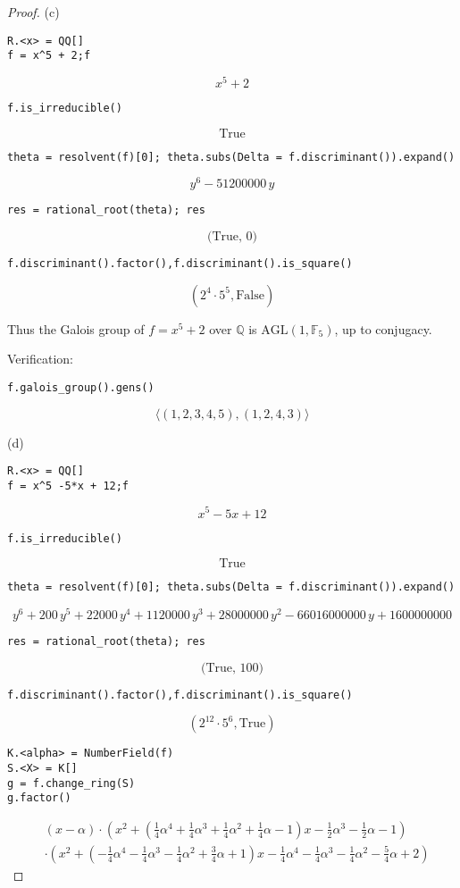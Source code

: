 \documentclass[11pt,a4paper]{article}
\newcommand{\Q}{\mathbb{Q}}
\newcommand{\F}{\mathbb{F}}
\begin{document}
\begin{proof}
\item[(c)]
\begin{verbatim}
R.<x> = QQ[]
f = x^5 + 2;f
\end{verbatim}
$$	
x^{5} + 2
$$
\begin{verbatim}
f.is_irreducible()
\end{verbatim}
$$\text{True}$$
\begin{verbatim}
theta = resolvent(f)[0]; theta.subs(Delta = f.discriminant()).expand()
\end{verbatim}
$$y^{6} - 51200000 \, y
$$
\begin{verbatim}
res = rational_root(theta); res
\end{verbatim}
$$\text{(True, 0)}$$
\begin{verbatim}
f.discriminant().factor(),f.discriminant().is_square()
\end{verbatim}
$$(2^{4} \cdot 5^{5}, \text{False})
$$

Thus the Galois group of $f = x^5+2$ over $\Q$ is $\mathrm{AGL}(1,\F_5)$, up to conjugacy.

Verification:
\begin{verbatim}
f.galois_group().gens()
\end{verbatim}
$$	
\langle (1,2,3,4,5), (1,2,4,3) \rangle
$$

\item[(d)]
\begin{verbatim}
R.<x> = QQ[]
f = x^5 -5*x + 12;f
\end{verbatim}
$$	
x^{5} - 5x + 12
$$
\begin{verbatim}
f.is_irreducible()
\end{verbatim}
$$\text{True}$$
\begin{verbatim}
theta = resolvent(f)[0]; theta.subs(Delta = f.discriminant()).expand()
\end{verbatim}
$$y^{6} + 200 \, y^{5} + 22000 \, y^{4} + 1120000 \, y^{3} + 28000000 \,
y^{2} - 66016000000 \, y + 1600000000
$$
\begin{verbatim}
res = rational_root(theta); res
\end{verbatim}
$$\text{(True, 100)}$$
\begin{verbatim}
f.discriminant().factor(),f.discriminant().is_square()
\end{verbatim}

$$(2^{12} \cdot 5^{6}, \text{True})$$
\begin{verbatim}
K.<alpha> = NumberField(f)
S.<X> = K[]
g = f.change_ring(S)
g.factor()
\end{verbatim}
\begin{align*}
&(x - \alpha)
 \cdot \left(x^{2} + \left(\frac{1}{4} \alpha^{4} + \frac{1}{4}
\alpha^{3} + \frac{1}{4} \alpha^{2} + \frac{1}{4} \alpha - 1\right) x -
\frac{1}{2} \alpha^{3} - \frac{1}{2} \alpha - 1\right)\\
& \cdot \left(x^{2} +\left(-\frac{1}{4} \alpha^{4} - \frac{1}{4} \alpha^{3} - \frac{1}{4}
\alpha^{2} + \frac{3}{4} \alpha + 1\right) x - \frac{1}{4} \alpha^{4} -
\frac{1}{4} \alpha^{3} - \frac{1}{4} \alpha^{2} - \frac{5}{4} \alpha +
2\right)
\end{align*}


\end{proof}
\end{document}
